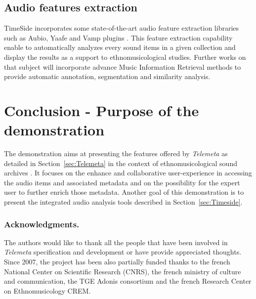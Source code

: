 \documentclass[runningheads,a4paper]{llncs}
\begin{document}
\subsection{Audio features extraction}
TimeSide incorporates some state-of-the-art audio feature extraction libraries such as Aubio, Yaafe and Vamp plugins \cite{brossierPhD,yaafe_ISMIR2010,vamp-plugins}.
This feature extraction capability enable to automatically analyzes every sound items in a given collection and display the results as a support to ethnomusicological studies.
Further works on that subject will incorporate advance Music Information Retrieval methods to provide automatic annotation, segmentation and similarity analysis.

\section{Conclusion - Purpose of the demonstration}\vspace{-0.2cm}
The demonstration aims at presenting the features offered by \emph{Telemeta} as detailed in Section~\ref{sec:Telemeta} in the context of ethnomusicological sound archives \cite{telemetaCREM}. It focuses on the enhance and collaborative user-experience in accessing the audio items and associated metadata and on the possibility for the expert user to further enrich those metadata.
Another goal of this demonstration is to present the integrated audio analysis tools described in Section~\ref{sec:Timeside}.

\vspace{-0.2cm}
\subsubsection*{Acknowledgments.} 
The authors would like to thank all the people that have been involved in \emph{Telemeta} specification and development or have provide appreciated thoughts. Since 2007, the project has been also partially funded thanks to the french National Center on Scientific Research (CNRS), the french ministry of culture and communication, the TGE Adonis consortium and the french Research Center on Ethnomusicology CREM.




\end{document}
